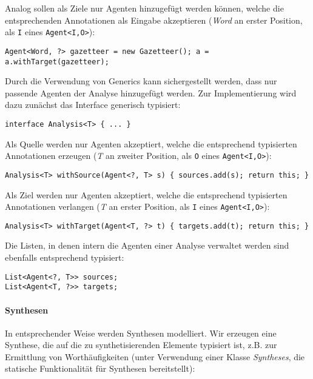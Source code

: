 \documentclass[abstracton, 12pt]{scrartcl}
\begin{document}
Analog sollen als Ziele nur Agenten hinzugefügt werden können, welche die entsprechenden Annotationen als Eingabe akzeptieren (\emph{Word} an erster Position, als \lstinline!I! eines \lstinline!Agent<I,O>!): 

\begin{lstlisting}
Agent<Word, ?> gazetteer = new Gazetteer(); a = a.withTarget(gazetteer);
\end{lstlisting}

Durch die Verwendung von Generics kann sichergestellt werden, dass nur passende Agenten der Analyse hinzugefügt werden. Zur Implementierung wird dazu zunächst das Interface generisch typisiert:

\begin{lstlisting}
interface Analysis<T> { ... }
\end{lstlisting}

Als Quelle werden nur Agenten akzeptiert, welche die entsprechend typisierten Annotationen erzeugen (\emph{T} an zweiter Position, als \lstinline!O! eines \lstinline!Agent<I,O>!):

\begin{lstlisting}
Analysis<T> withSource(Agent<?, T> s) { sources.add(s); return this; }
\end{lstlisting}

Als Ziel werden nur Agenten akzeptiert, welche die entsprechend typisierten Annotationen verlangen (\emph{T} an erster Position, als \lstinline!I! eines \lstinline!Agent<I,O>!):

\begin{lstlisting}
Analysis<T> withTarget(Agent<T, ?> t) { targets.add(t); return this; }
\end{lstlisting}

Die Listen, in denen intern die Agenten einer Analyse verwaltet werden sind ebenfalls entsprechend typisiert:

\begin{lstlisting}
List<Agent<?, T>> sources;
List<Agent<T, ?>> targets;
\end{lstlisting}

\paragraph{Synthesen}

In entsprechender Weise werden Synthesen modelliert. Wir erzeugen eine Synthese, die auf die zu synthetisierenden Elemente typisiert ist, z.B. zur Ermittlung von Worthäufigkeiten (unter Verwendung einer Klasse \emph{Syntheses}, die statische Funktionalität für Synthesen bereitstellt):
\end{document}
